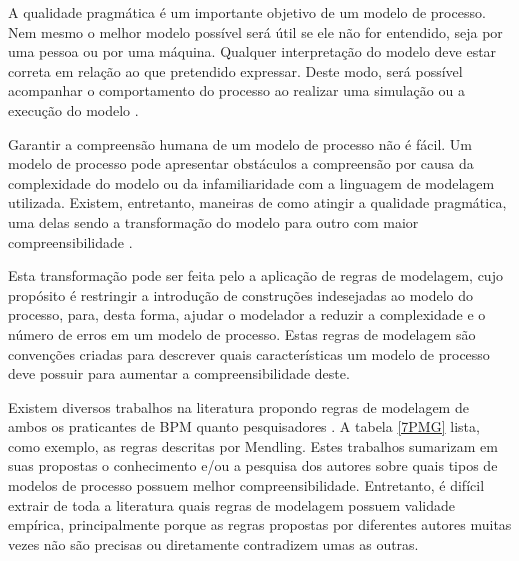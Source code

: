 \documentclass[12pt]{article}
\begin{document}
A qualidade pragmática é um importante objetivo de um modelo de processo. Nem mesmo o melhor modelo possível será útil se ele não for entendido, seja por uma pessoa ou por uma máquina. Qualquer interpretação do modelo deve estar correta em relação ao que pretendido expressar. Deste modo, será possível acompanhar o comportamento do processo ao realizar uma simulação ou a execução do modelo \cite{Krogstie2012}.


Garantir a compreensão humana de um modelo de processo não é fácil. Um modelo de processo pode apresentar obstáculos a compreensão por causa da complexidade do modelo ou da infamiliaridade com a linguagem de modelagem utilizada. Existem, entretanto, maneiras de como atingir a qualidade pragmática, uma delas sendo a transformação do modelo para outro com maior compreensibilidade \cite{Krogstie2012}. 

Esta transformação pode ser feita pelo a aplicação de regras de modelagem, cujo propósito é restringir a introdução de construções indesejadas ao modelo do processo, para, desta forma, ajudar o modelador a reduzir a complexidade e o número de erros em um modelo de processo. Estas regras de modelagem são convenções criadas para descrever quais características um modelo de processo deve possuir para aumentar a compreensibilidade deste.

Existem diversos trabalhos na literatura propondo regras de modelagem de ambos os praticantes de BPM \cite{Silver2009} \cite{White2008} \cite{Allweyer2010} quanto pesquisadores \cite{Becker2000} \cite{Mendling2007} \cite{Vanderfeesten2008} \cite{Correia2012}. A tabela \ref{7PMG} lista, como exemplo, as regras descritas por Mendling. Estes trabalhos sumarizam em suas propostas o conhecimento e/ou a pesquisa dos autores sobre quais tipos de modelos de processo possuem melhor compreensibilidade. Entretanto, é difícil extrair de toda a literatura quais regras de modelagem possuem validade empírica, principalmente porque as regras propostas por diferentes autores muitas vezes não são precisas ou diretamente contradizem umas as outras. 
\end{document}
